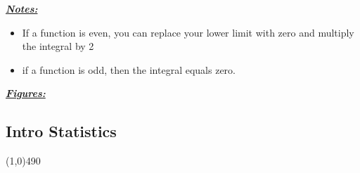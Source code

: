 \documentclass{report}
\begin{document}
      \bigbreak \noindent \bigbreak \noindent
      \textbf{\textit{\underline{Notes:}}}
      \begin{itemize}
        \item If a function is even, you can replace your lower limit with zero and multiply the integral by 2
        \item if a function is odd, then the integral equals zero.
      \end{itemize}

      \bigbreak \noindent \bigbreak \noindent
      \textbf{\textit{\underline{Figures:}}}
      \begin{figure}[ht]
          \centering
          \label{fig:fig1even}
      \end{figure}

      \pagebreak \bigbreak \noindent
      \begin{center}
        \section{Intro Statistics}
      \end{center}
      \line(1,0){490}
      \bigbreak \noindent 
\end{document}
